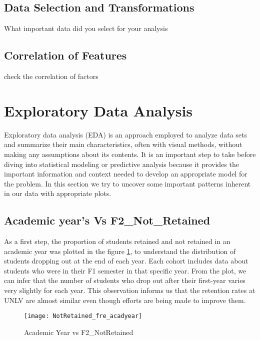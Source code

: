 \documentclass[11pt,openright]{report}
\begin{document}
\subsection {Data Selection and Transformations}
What important data did you select for your analysis
\subsection {Correlation of Features}
check the correlation of factors

\section{Exploratory Data Analysis}
Exploratory data analysis (EDA) is an approach employed to analyze data sets and summarize their main characteristics, often with visual methods, without making any assumptions about its contents. It is an important step to take before diving into statistical modeling or predictive analysis because it provides the important information and context needed to develop an appropriate model for the problem. In this section we try to uncover some important patterns inherent in our data with appropriate plots.

\subsection {Academic year's Vs F2\_Not\_Retained}
As a first step, the proportion of students retained and not retained in an academic year was plotted in the figure \ref{fig:AcadYear_F2NotRetained_plot}, to understand the distribution of students dropping out at the end of each year. Each cohort includes data about students who were in their F1 semester in that specific year. From the plot, we can infer that the number of students who drop out after their first-year varies  very slightly for each year. This observation informs us that the retention rates at UNLV are almost similar even though efforts are being made to improve them.

\begin{figure}[!htbp]
	\centering
	\texttt{[image: NotRetained\_fre\_acadyear]}
	\caption{Academic Year vs F2\_NotRetained}
	\label{fig:AcadYear_F2NotRetained_plot}
\end{figure}
\end{document}
